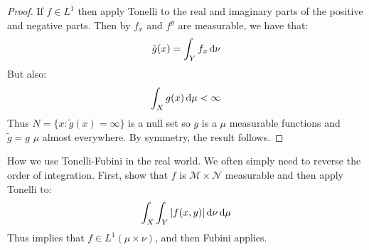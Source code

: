 \documentclass[crop=false,class=article]{standalone}                           %
\begin{document}
        \begin{proof}
            If $f\in{L}^{1}$ then apply Tonelli to the real and imaginary parts
            of the positive and negative parts. Then by $f_{x}$ and $f^{y}$ are
            measurable, we have that:
            \begin{equation}
                \tilde{g}(x)=\int_{Y}f_{x}\mathop{}\!\mathrm{d}\nu
            \end{equation}
            But also:
            \begin{equation}
                \int_{X}g(x)\mathop{}\!\mathrm{d}\mu<\infty
            \end{equation}
            Thus $N=\{x:\tilde{g}(x)=\infty\}$ is a null set so $g$ is a
            $\mu$ measurable functions and $\tilde{g}=g$ $\mu$ almost
            everywhere. By symmetry, the result follows.
        \end{proof}
        How we use Tonelli-Fubini in the real world. We often simply need to
        reverse the order of integration. First, show that $f$ is
        $\mathcal{M}\times\mathcal{N}$ measurable and then apply Tonelli to:
        \begin{equation}
            \int_{X}\int_{Y}|f(x,y)|\mathop{}\!\mathrm{d}\nu\mathop{}\!\mathrm{d}\mu
        \end{equation}
        Thus implies that $f\in{L}^{1}(\mu\times\nu)$, and then Fubini applies.
\end{document}
